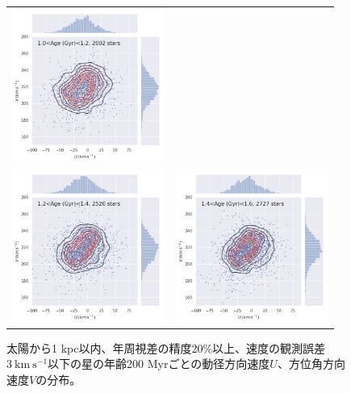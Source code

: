 \begin{figure}[htbp]
\begin{tabular}{cc}
\includegraphics[width=5cm]{fig/UV/1to1.2Gyr_z0.1kpc_hist2d.png}\\
\includegraphics[width=5cm]{fig/UV/1.2to1.4Gyr_z0.1kpc_hist2d.png}&
\includegraphics[width=5cm]{fig/UV/1.4to1.6Gyr_z0.1kpc_hist2d.png}\\
\end{tabular}
    \caption{太陽から1 kpc以内、年周視差の精度20\%以上、速度の観測誤差$3\ \mathrm{km\ s^{-1}}$以下の星の年齢200 Myrごとの動径方向速度$U$、方位角方向速度$V$の分布。}
    \label{hist_UV_200Myr}
\end{figure}

